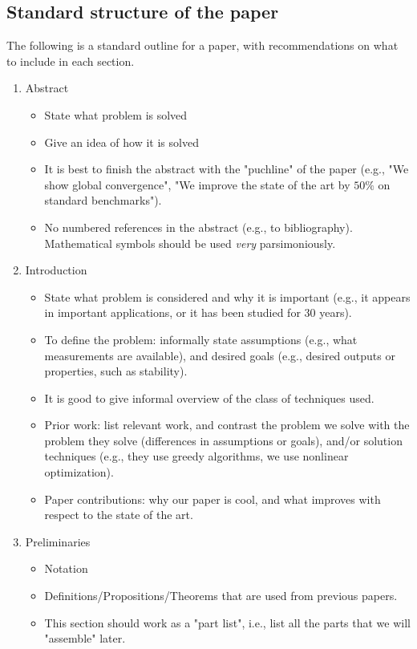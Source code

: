 \documentclass[letterpaper, 10 pt, conference]{ieeeconf}
\begin{document}
\subsection{Standard structure of the paper}
The following is a standard outline for a paper, with recommendations on what to include in each section.
\begin{enumerate}
\item Abstract
  \begin{itemize}
  \item State what problem is solved
  \item Give an idea of how it is solved
  \item It is best to finish the abstract with the "puchline" of the paper (e.g., "We show global convergence", "We improve the state of the art by $50\%$ on standard benchmarks").
  \item No numbered references in the abstract (e.g., to bibliography). Mathematical symbols should be used \emph{very} parsimoniously.
  \end{itemize}
\item Introduction
  \begin{itemize}
  \item State what problem is considered and why it is important (e.g., it
    appears in important applications, or it has been studied for 30 years).
  \item To define the problem: informally state assumptions (e.g., what measurements are available), and desired goals (e.g., desired outputs or properties, such as stability).
  \item It is good to give informal overview of the class of techniques used.
  \item Prior work: list relevant work, and contrast the problem we solve with the problem they solve (differences in assumptions or goals), and/or solution techniques (e.g., they use greedy algorithms, we use nonlinear optimization).
  \item Paper contributions: why our paper is cool, and what improves with respect to the state of the art.
  \end{itemize}
\item Preliminaries
  \begin{itemize}
  \item Notation
  \item Definitions/Propositions/Theorems that are used from previous papers.
  \item This section should work as a "part list", i.e., list all the parts that we will "assemble" later.

\end{itemize}
\end{enumerate}
\end{document}
